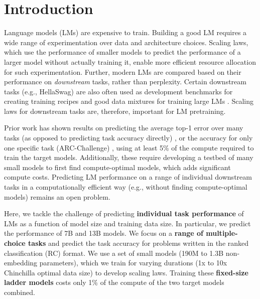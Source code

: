 \section{Introduction}
\label{sec:introduction}

Language models (LMs) are expensive to train. Building a good LM requires a wide range of experimentation over data and architecture choices. Scaling laws, which use the performance of smaller models to predict the performance of a larger model without actually training it, enable more efficient resource allocation for such experimentation.
Further, modern LMs are compared based on their performance on \textit{downstream} tasks, rather than perplexity. 
Certain downstream tasks (e.g., HellaSwag) are also often used as development benchmarks for creating training recipes and good data mixtures for training large LMs \citep{OLMo20242O2,Li2024DataCompLMIS}. %
Scaling laws for downstream tasks are, therefore, important for LM pretraining. 

Prior work has shown results on predicting the average top-1 error over many tasks (as opposed to predicting task accuracy directly) \citep{Gadre2024LanguageMS}, or the accuracy for only one specific task (ARC-Challenge) \citep{Dubey2024TheL3},
using at least 5\% of the compute required to train the target
models. Additionally, these require developing a testbed of many small models to first find compute-optimal models, which adds significant compute costs.
Predicting LM performance on a range of individual downstream tasks in a computationally efficient way (e.g., without finding compute-optimal models) remains an open problem. 

Here, we tackle the challenge of predicting \textbf{individual task performance} of LMs as a function of model size and training data size. In particular, we predict the performance of 7B and 13B models. We focus on a \textbf{range of multiple-choice tasks} and predict the task accuracy for problems written in the ranked classification (RC) format. We use a set of small models (190M to 1.3B non-embedding parameters), which we train for varying durations (1x to 10x Chinchilla optimal data size) to develop scaling laws. Training these \textbf{fixed-size ladder models} costs only 1\% of the compute of the two target models combined. 

